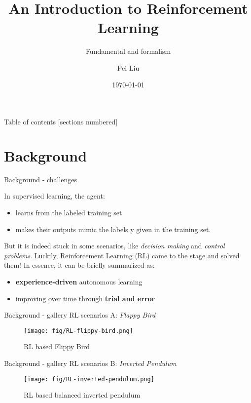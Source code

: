 \documentclass[10pt]{beamer}
\title{An Introduction to Reinforcement Learning}
\subtitle{Fundamental and formalism}
\date{\today}
\author{Pei Liu}
\institute{Department of Computer Science @UESTC}
\begin{document}
\maketitle

\begin{frame}{Table of contents}
  [sections numbered]
  \tableofcontents[hideallsubsections]
\end{frame}

\section{Background}

\begin{frame}[fragile]{Background - challenges}
  
  In supervised learning, the agent:
  \begin{itemize}
    \item learns from the labeled training set
    \item makes their outputs mimic the labels y given in the training set.
  \end{itemize}

  But it is indeed stuck in some scenarios, like \emph{decision making} and \emph{control problems}.  Luckily, \alert{Reinforcement Learning (RL)} came to the stage and solved them! In essence, it can be briefly summarized as:
  \begin{itemize}
    \item \textbf{experience-driven} autonomous learning
    \item improving over time through \textbf{trial and error}
  \end{itemize}
 
\end{frame}

\begin{frame}[fragile]{Background - gallery}
  RL scenarios A: \textit{Flappy Bird}
  \begin{figure}[htbp]
    \centering
    \texttt{[image: fig/RL-flippy-bird.png]}
    \caption{RL based Flippy Bird}
  \end{figure}
\end{frame}

\begin{frame}[fragile]{Background - gallery}
  RL scenarios B: \textit{Inverted Pendulum}
  \begin{figure}[htbp]
    \centering
    \texttt{[image: fig/RL-inverted-pendulum.png]}
    \caption{RL based balanced inverted pendulum}
  \end{figure}
\end{frame}
\end{document}
